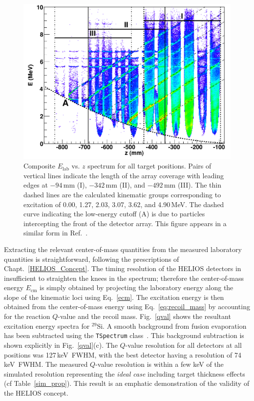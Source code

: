 \begin{figure}[ht]
\centering
\includegraphics[width=\linewidth,keepaspectratio]{Figures/cShift}
\caption[Composite $E_\textrm{lab}$ vs. $z$ spectrum for all target positions]{Composite $E_\textrm{lab}$ vs. $z$ spectrum for all target positions.  Pairs of vertical lines indicate the length of the array coverage with leading edges at $-94$\,mm (I), $-342$\,mm (II), and $-492$\,mm (III).  The thin dashed lines are the calculated kinematic groups corresponding to excitation of 0.00, 1.27, 2.03, 3.07, 3.62, and 4.90\,MeV.  The dashed curve indicating the low-energy cutoff (A) is due to particles intercepting the front of the detector array.  This figure appears in a similar form in Ref.~\cite{Lighthall_2010}.}
\label{hEZ}
\end{figure}

Extracting the relevant center-of-mass quantities from the measured laboratory quantities is straightforward, following the prescriptions of Chapt.~\ref{HELIOS_Concept}.  The timing resolution of the HELIOS detectors in insufficient to straighten the knees in the spectrum; therefore the center-of-mass energy $E_\mathrm{cm}$ is simply obtained by projecting the laboratory energy along the slope of the kinematic loci using Eq.~\ref{ecm}.  The excitation energy is then obtained from the center-of-mass energy using Eq.~\ref{eq:recoil_mass} by accounting for the reaction $Q$-value and the recoil mass.  Fig.~\ref{qval} shows the resultant excitation energy spectra for $^{29}$Si.  A smooth background from fusion evaporation %
has been subtracted using the \texttt{TSpectrum} class~\cite{Morhac_2000}.  This background subtraction is shown explicitly in Fig.~\ref{qval}(c).  The $Q$-value resolution for all detectors at all positions was 127\,keV~FWHM, with the best detector having a resolution of 74\,keV~FWHM.  The measured $Q$-value resolution is within a few keV of the simulated resolution representing the \textit{ideal case} including target thickness effects (cf Table~\ref{sim_prop}).%
This result is an emphatic demonstration of the validity of the HELIOS concept.

